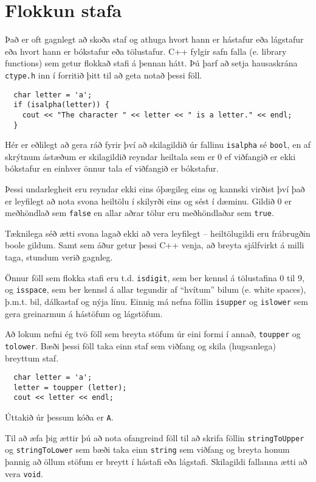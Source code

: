 \section{Flokkun stafa}

Það er oft gagnlegt að skoða staf og athuga hvort hann er hástafur eða lágstafur eða hvort hann er bókstafur eða tölustafur.
C++ fylgir safn falla (e. library functions) sem getur flokkað stafi á þennan hátt.
Þú þarf að setja hausaskrána {\tt ctype.h} inn í forritið þitt til að geta notað þessi föll.

\begin{verbatim}
  char letter = 'a';
  if (isalpha(letter)) {
    cout << "The character " << letter << " is a letter." << endl;
  }
\end{verbatim}
%
Hér er eðlilegt að gera ráð fyrir því að skilagildið úr fallinu {\tt isalpha} sé {\tt bool}, 
en af skrýtnum ástæðum er skilagildið reyndar heiltala sem er 0 ef viðfangið er ekki bókstafur en einhver önnur tala ef viðfangið er bókstafur.

Þessi undarlegheit eru reyndar ekki eins óþægileg eins og kannski virðist því það er leyfilegt að nota svona heiltölu í skilyrði eins og sést í dæminu.
Gildið 0 er meðhöndlað sem {\tt false} en allar aðrar tölur eru meðhöndlaðar sem {\tt true}.

Tæknilega séð ætti svona lagað ekki að vera leyfilegt -- heiltölugildi eru frábrugðin boole gildum.
Samt sem áður getur þessi C++ venja, að breyta sjálfvirkt á milli taga, stundum verið gagnleg.

Önnur föll sem flokka stafi eru t.d. {\tt isdigit}, sem ber kennsl á tölustafina 0 til 9, 
og {\tt isspace}, sem ber kennsl á allar tegundir af ``hvítum'' bilum (e. white spaces), þ.m.t. bil, dálkastaf og nýja línu.
Einnig má nefna föllin {\tt isupper} og {\tt islower} sem gera greinarmun á hástöfum og lágstöfum.

Að lokum nefni ég tvö föll sem breyta stöfum úr eini formi í annað, {\tt toupper} og {\tt tolower}.
Bæði þessi föll taka einn staf sem viðfang og skila (hugsanlega) breyttum staf. 

\begin{verbatim}
  char letter = 'a';
  letter = toupper (letter);
  cout << letter << endl;
\end{verbatim}
%
Úttakið úr þessum kóða er {\tt A}.

Til að æfa þig ættir þú að nota ofangreind föll til að skrifa föllin {\tt stringToUpper} og
{\tt stringToLower} sem bæði taka einn {\tt string} sem viðfang og breyta honum þannig að öllum stöfum er breytt í hástafi eða lágstafi.
Skilagildi fallanna ætti að vera {\tt void}.

